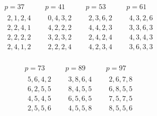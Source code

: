 %
\[
\begin{array}{c|c|c|c}
\begin{gathered}
p=37\\[3pt]
\begin{array}{l}
2,1,2,4\\
2,2,4,1\\
2,2,2,2\\
2,4,1,2
\end{array}
\end{gathered}&
\begin{gathered}
p=41\\[3pt]
\begin{array}{l}
0,4,3,2\\
4,2,2,2\\
3,2,3,2\\
2,2,2,4
\end{array}
\end{gathered}&
\begin{gathered}
p=53\\[3pt]
\begin{array}{l}
2,3,6,2\\
4,4,2,3\\
2,4,2,4\\
4,2,3,4
\end{array}
\end{gathered}&
\begin{gathered}
p=61\\[3pt]
\begin{array}{l}
4,3,2,6\\
3,3,6,3\\
4,3,4,3\\
3,6,3,3
\end{array}
\end{gathered}
\end{array}
\]

\[
\begin{array}{c|c|c}
\begin{gathered}
p=73\\[3pt]
\begin{array}{l}
5,6,4,2\\
6,2,5,5\\
4,5,4,5\\
2,5,5,6
\end{array}
\end{gathered}&
\begin{gathered}
p=89\\[3pt]
\begin{array}{l}
3,8,6,4\\
8,4,5,5\\
6,5,6,5\\
4,5,5,8
\end{array}
\end{gathered}&
\begin{gathered}
p=97\\[3pt]
\begin{array}{l}
2,6,7,8\\
6,8,5,5\\
7,5,7,5\\
8,5,5,6
\end{array}
\end{gathered}
\end{array}
\]

